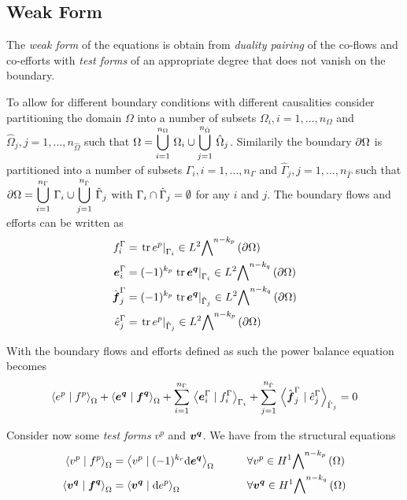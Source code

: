 \subsection{Weak Form}

The \emph{weak form} of the equations is obtain from \emph{duality pairing} of
the co-flows and co-efforts with \emph{test forms} of an appropriate degree
that does not vanish on the boundary.

To allow for different boundary conditions with different causalities consider
partitioning the domain $\Omega$ into a number of subsets
$\Omega_{i},i=1,...,n_{\Omega}$ and
$\hat{\Omega}_{j},j=1,...,n_{\hat{\Omega}}$ such that
$\Omega=  \displaystyle\bigcup _{i=1}^{n_{\Omega}}\,\Omega_{i} \cup  \displaystyle\bigcup _{j=1}^{n_{\hat{\Omega}}}\,\hat{\Omega}_{j} $. Similarily
the boundary $ \partial{\Omega} $ is partitioned into a number of subsets
$\Gamma_{i},i=1,...,n_{\Gamma}$ and
$\hat{\Gamma}_{j},j=1,...,n_{\hat{\Gamma}}$ such that
$ \partial{\Omega} =  \displaystyle\bigcup _{i=1}^{n_{\Gamma}}\,\Gamma_{i} \cup  \displaystyle\bigcup _{j=1}^{n_{\hat{\Gamma}}}\,\hat{\Gamma}_{j} $
with $\Gamma_{i}\cap\hat{\Gamma}_{j}=\emptyset$ for any $i$ and
$j$. The boundary flows and efforts can be written as
\begin{align}
  f^{\Gamma}_{i}&=\evalat{\trace{}{e^{p}}}{\Gamma_{i}}\in\ltwodiffformspace{n-k_{p}}{\boundary{\Omega}} \\
  \covectr{e}^{\Gamma}_{i}&=(-1)^{k_{p}}\evalat{\trace{}{\covectr{e}^{\covectr{q}}}}{\Gamma_{i}}\in\ltwodiffformspace{n-k_{q}}{\boundary{\Omega}}\\
  \hat{\covectr{f}}^{\Gamma}_{j}&=(-1)^{k_{p}}\evalat{\trace{}{\covectr{e}^{\covectr{q}}}}{\hat{\Gamma}_{j}}\in\ltwodiffformspace{n-k_{q}}{\boundary{\Omega}}\\
  \hat{e}^{\Gamma}_{j}&=\evalat{\trace{}{e^{p}}}{\hat{\Gamma}_{j}}\in\ltwodiffformspace{n-k_{p}}{\boundary{\Omega}}
\end{align}

With the boundary flows and efforts defined as such the power balance equation
becomes
\begin{equation}
  \dualityform{e^{p}}{f^{p}}{\Omega}+\dualityform{\covectr{e}^{\covectr{q}}}{\covectr{f}^{\covectr{q}}}{\Omega}+\gsum{i=1}{n_{\Gamma}}{\dualityform{\covectr{e}^{\Gamma}_{i}}{f^{\Gamma}_{i}}{\Gamma_{i}}}+\gsum{j=1}{n_{\hat{\Gamma}}}{\dualityform{\hat{\covectr{f}}^{\Gamma}_{j}}{\hat{e}^{\Gamma}_{j}}{\hat{\Gamma}_{j}}}=0
\end{equation}

Consider now some \emph{test forms} $v^{p}$ and $ \boldsymbol{v} ^{ \boldsymbol{q} }$. We have from the
structural equations
\begin{align}
  \dualityform{v^{p}}{f^{p}}{\Omega}&=\dualityform{v^{p}}{(-1)^{k_{r}}\exteriorderiv{\covectr{e}^{\covectr{q}}}}{\Omega}&\qquad&\forall
  v^{p}\in\honediffformspace{n-k_{p}}{\Omega}\\ \dualityform{\covectr{v}^{\covectr{q}}}{\covectr{f}^{\covectr{q}}}{\Omega}&=\dualityform{\covectr{v}^{\covectr{q}}}{\exteriorderiv{e^{p}}}{\Omega}&\qquad&\forall
  \covectr{v}^{\covectr{q}}\in\honediffformspace{n-k_{q}}{\Omega}
\end{align}

